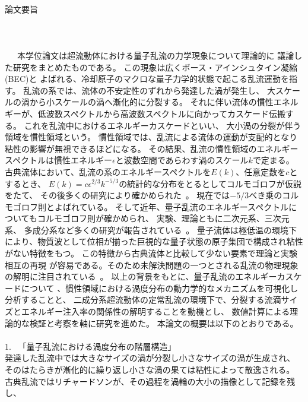 \documentclass[12pt,a4paper]{jbook}
\begin{document}
	\newpage
	\ 　
	\\
	{\Huge 論文要旨}
	\\
	\\
	\\
	\\
	\ 　本学位論文は超流動体における量子乱流の力学現象について理論的に
	議論した研究をまとめたものである。
	この現象は広くボース・アインシュタイン凝縮(BEC)と
	よばれる、冷却原子のマクロな量子力学的状態で起こる乱流運動を指す。
	乱流の系では、流体の不安定性のずれから発達した渦が発生し、
    	大スケールの渦から小スケールの渦へ漸化的に分裂する。
	それに伴い流体の慣性エネルギーが、低波数スペクトルから高波数スペクトルに向かってカスケード伝搬する。
	これを乱流中におけるエネルギーカスケードといい、
	大小渦の分裂が伴う領域を慣性領域という。
	慣性領域では、乱流による流体の運動が支配的となり粘性の影響が無視できるほどになる。
	その結果、乱流の慣性領域のエネルギースペクトルは慣性エネルギー$\epsilon$と波数空間であらわす渦のスケール$k$で定まる。
	古典流体において、乱流の系のエネルギースペクトルを$E(k)$、任意定数を$c$とするとき、
	$E(k)=c\epsilon^{2/3}k^{-5/3}$の統計的な分布をとるとしてコルモゴロフが仮説をたて、
    	その後多くの研究により確かめられた~\cite{Kolmogorov,Batchelor,Tatsumi1,Tatsumi2,Kraichnan,Frisch1,Frisch2,Cyril}。
	現在では$-5/3$べき乗のコルモゴロフ則とよばれている。
	そして近年、量子乱流のエネルギースペクトルについてもコルモゴロフ則が確かめられ、
	実験、理論ともに二次元系、三次元系、
    	多成分系など多くの研究が報告されている~\cite{Navon, Kobayashi1,Kobayashi2,Kobayashi3, Araki, paper1}。
	量子流体は極低温の環境下により、物質波として位相が揃った巨視的な量子状態の原子集団で構成され粘性がない特徴をもつ。
	この特徴から古典流体と比較して少ない要素で理論と実験相互の再現
	が容易である。そのため未解決問題の一つとされる乱流の物理現象の解明に注目されている~\cite{Ginzburg}。
	以上の背景をもとに、量子乱流のエネルギーカスケードについて
	、慣性領域における渦度分布の動力学的なメカニズムを可視化し分析することと、
    	二成分系超流動体の定常乱流の環境下で、分裂する流滴サイズとエネルギー注入率の関係性の解明することを動機とし、
	数値計算による理論的な検証と考察を軸に研究を進めた。
	本論文の概要は以下のとおりである。
    	\\
    	\\
	1. \ 「量子乱流における渦度分布の階層構造」
    	\\
	発達した乱流中では大きなサイズの渦が分裂し小さなサイズの渦が生成され、
    	そのはたらきが漸化的に繰り返し小さな渦の果ては粘性によって散逸される。
    	古典乱流ではリチャードソンが、その過程を渦輪の大小の描像として記録を残し、
\end{document}
